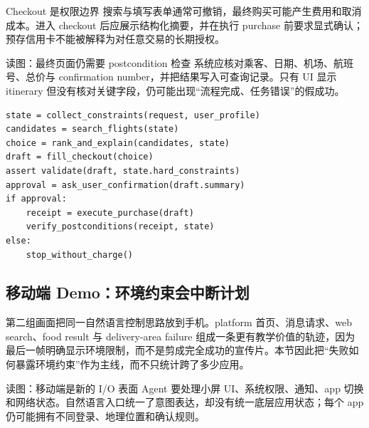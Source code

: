 \begin{warningbox}{Checkout 是权限边界}
搜索与填写表单通常可撤销，最终购买可能产生费用和取消成本。进入 checkout 后应展示结构化摘要，并在执行 purchase 前要求显式确认；预存信用卡不能被解释为对任意交易的长期授权。
\end{warningbox}


\begin{knowledgebox}{读图：最终页面仍需要 postcondition 检查}
系统应核对乘客、日期、机场、航班号、总价与 confirmation number，并把结果写入可查询记录。只有 UI 显示 itinerary 但没有核对关键字段，仍可能出现“流程完成、任务错误”的假成功。
\end{knowledgebox}


\begin{lstlisting}[caption={带确认门的订票状态机}]
state = collect_constraints(request, user_profile)
candidates = search_flights(state)
choice = rank_and_explain(candidates, state)
draft = fill_checkout(choice)
assert validate(draft, state.hard_constraints)
approval = ask_user_confirmation(draft.summary)
if approval:
    receipt = execute_purchase(draft)
    verify_postconditions(receipt, state)
else:
    stop_without_charge()
\end{lstlisting}

\subsection{移动端 Demo：环境约束会中断计划}

第二组画面把同一自然语言控制思路放到手机。platform 首页、消息请求、web search、food result 与 delivery-area failure 组成一条更有教学价值的轨迹，因为最后一帧明确显示环境限制，而不是剪成完全成功的宣传片。本节因此把“失败如何暴露环境约束”作为主线，而不只统计跨了多少应用。


\begin{knowledgebox}{读图：移动端是新的 I/O 表面}
Agent 要处理小屏 UI、系统权限、通知、app 切换和网络状态。自然语言入口统一了意图表达，却没有统一底层应用状态；每个 app 仍可能拥有不同登录、地理位置和确认规则。
\end{knowledgebox}

